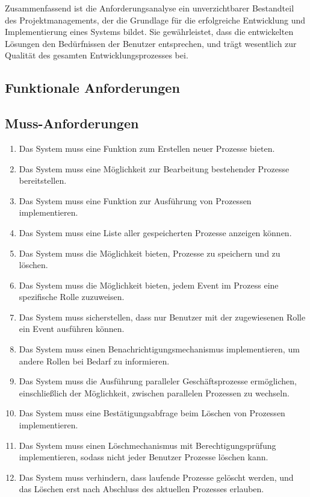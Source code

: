 Zusammenfassend ist die Anforderungsanalyse ein unverzichtbarer Bestandteil des Projektmanagements, der die Grundlage für die erfolgreiche Entwicklung und Implementierung eines Systems bildet. Sie gewährleistet, dass die entwickelten Lösungen den Bedürfnissen der Benutzer entsprechen, und trägt wesentlich zur Qualität des gesamten Entwicklungsprozesses bei.

\subsection{Funktionale Anforderungen} \label{f_Anforderungen}
\subsection*{Muss-Anforderungen}
\begin{enumerate}[label=\textbf{M\arabic*.}]
    \item Das System muss eine Funktion zum Erstellen neuer Prozesse bieten.
    \item Das System muss eine Möglichkeit zur Bearbeitung bestehender Prozesse bereitstellen.
    \item Das System muss eine Funktion zur Ausführung von Prozessen implementieren.
    \item Das System muss eine Liste aller gespeicherten Prozesse anzeigen können.
    \item Das System muss die Möglichkeit bieten, Prozesse zu speichern und zu löschen.
    \item Das System muss die Möglichkeit bieten, jedem Event im Prozess eine spezifische Rolle zuzuweisen. \label{M6}
    \item Das System muss sicherstellen, dass nur Benutzer mit der zugewiesenen Rolle ein Event ausführen können. \label{M7}
    \item Das System muss einen Benachrichtigungsmechanismus implementieren, um andere Rollen bei Bedarf zu informieren. \label{M8}
    \item Das System muss die Ausführung paralleler Geschäftsprozesse ermöglichen, einschließlich der Möglichkeit, zwischen parallelen Prozessen zu wechseln.
    \item Das System muss eine Bestätigungsabfrage beim Löschen von Prozessen implementieren.
    \item Das System muss einen Löschmechanismus mit Berechtigungsprüfung implementieren, sodass nicht jeder Benutzer Prozesse löschen kann.
    \item Das System muss verhindern, dass laufende Prozesse gelöscht werden, und das Löschen erst nach Abschluss des aktuellen Prozesses erlauben.
\end{enumerate}
